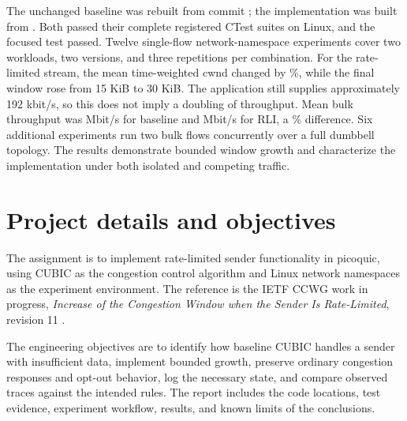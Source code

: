 \documentclass[11pt,a4paper]{article}
\newcommand{\code}[1]{\texttt{\detokenize{#1}}}
\begin{document}
The unchanged baseline was rebuilt from commit \texttt{\BaselineCommit};
the implementation was built from \texttt{\ImplementationCommit}. Both
passed their complete registered CTest suites on Linux, and the focused
\code{cubic_rli} test passed. Twelve single-flow network-namespace experiments
cover two workloads, two versions, and three repetitions per combination.
For the rate-limited stream, the mean time-weighted cwnd changed by
\WindowChange\%, while the final window rose from 15 KiB to 30 KiB.
The application still supplies approximately 192 kbit/s, so this does not
imply a doubling of throughput. Mean bulk throughput was
\BulkBaselineThroughput{} Mbit/s for baseline and
\BulkRliThroughput{} Mbit/s for RLI, a \BulkChange\% difference.
Six additional experiments run two bulk flows concurrently over a full
dumbbell topology. The results demonstrate bounded window growth and
characterize the implementation under both isolated and competing traffic.

\tableofcontents
\clearpage
{}

\section{Project details and objectives}
The assignment is to implement rate-limited sender functionality in picoquic,
using CUBIC as the congestion control algorithm and Linux network namespaces
as the experiment environment. The reference is the IETF CCWG work in
progress, \emph{Increase of the Congestion Window when the Sender Is
Rate-Limited}, revision 11 \cite{rli}.

The engineering objectives are to identify how baseline CUBIC handles a
sender with insufficient data, implement bounded growth, preserve ordinary
congestion responses and opt-out behavior, log the necessary state, and
compare observed traces against the intended rules. The report includes
the code locations, test evidence, experiment workflow, results, and known
limits of the conclusions.
\end{document}
